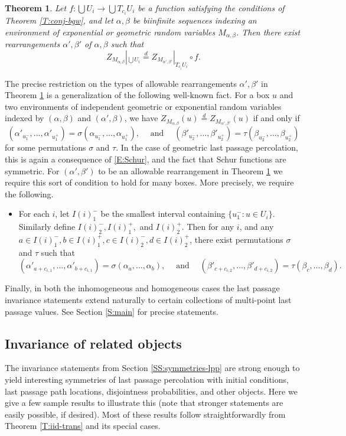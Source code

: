 \documentclass[aop, preprint]{imsart}
\theoremstyle{plain}
\newtheorem{theorem}{Theorem}[section]
\theoremstyle{definition}
\theoremstyle{plain}
\newcommand{\al}{\alpha}
\newcommand{\mathand}{\;\text{and}\;}
\newcommand{\be}{\beta}
\newcommand{\sig}{\sigma}
\newcommand{\eqd}{\stackrel{d}{=}}
\begin{document}
\begin{theorem}
	\label{T:inhom-ex}
	Let $f:\bigcup U_i \to \bigcup T_{c_i} U_i$ be a function satisfying the conditions of Theorem \ref{T:conj-bgw}, and let $\al, \be$ be biinfinite sequences indexing an environment of exponential or geometric random variables $M_{\al, \be}$. Then there exist rearrangements $\al', \be'$ of $\al, \be$ such that
	$$
	Z_{M_{\al, \be}}|_{\bigcup U_i} \eqd Z_{M_{\al', \be'}}|_{T_{c_i} U_i} \circ f.
	$$
\end{theorem}
The precise restriction on the types of allowable rearrangements $\al', \be'$ in Theorem \ref{T:inhom-ex} is a generalization of the following well-known fact. For a box $u$ and two environments of independent geometric or exponential random variables indexed by $(\al, \be)$ and $(\al', \be)$, we have
$
	Z_{M_{\al, \be}}(u) \eqd Z_{M_{\al', \be'}}(u)
$
if and only if
$$
(\al'_{u^-_1}, \dots, \al'_{u^+_1}) = \sig (\al_{u^-_1}, \dots, \al_{u^+_1}), \quad \mathand \quad (\beta'_{u^-_2}, \dots, \beta'_{u^+_2}) = \tau (\beta_{u^-_2}, \dots, \beta_{u^+_2})
$$
for some permutations $\sig$ and $\tau$. In the case of geometric last passage percolation, this is again a consequence of \eqref{E:Schur}, and the fact that Schur functions are symmetric.
For $(\al', \be')$ to be an allowable rearrangement in Theorem \ref{T:inhom-ex} we require this sort of condition to hold for many boxes. More precisely, we require the following.
\begin{itemize}
	\item For each $i$, let $I(i)^-_1$ be the smallest interval
	containing $\{u^-_1 : u \in U_i\}$. Similarly define $I(i)^-_2, I(i)^+_1,$ and $I(i)^+_2$. Then for any $i$, and any $a \in I(i)^-_1, b \in I(i)^+_1, c \in I(i)^-_2, d \in I(i)^+_2$, there exist permutations $\sig$ and $\tau$ such that
	$$
	(\al'_{a + c_{i, 1}}, \dots, \al'_{b + c_{i, 1}}) = \sig (\al_a, \dots, \al_b), \quad \mathand \quad (\beta'_{c + c_{i, 2}}, \dots, \beta'_{d + c_{i, 2}}) = \tau (\beta_{c}, \dots, \beta_{d}).
	$$
	\end{itemize}

Finally, in both the inhomogeneous and homogeneous cases the last passage invariance statements extend naturally to certain collections of multi-point last passage values. See Section \ref{S:main} for precise statements.

\subsection{Invariance of related objects}
\label{SS:symmetries}
The invariance statements from Section \ref{SS:symmetries-lpp} are strong enough to yield interesting symmetries of last passage percolation with initial conditions, last passage path locations, disjointness probabilities, and other objects. Here we give a few sample results to illustrate this (note that stronger statements are easily possible, if desired). Most of these results follow straightforwardly from Theorem \ref{T:iid-trans} and its special cases.
\end{document}
